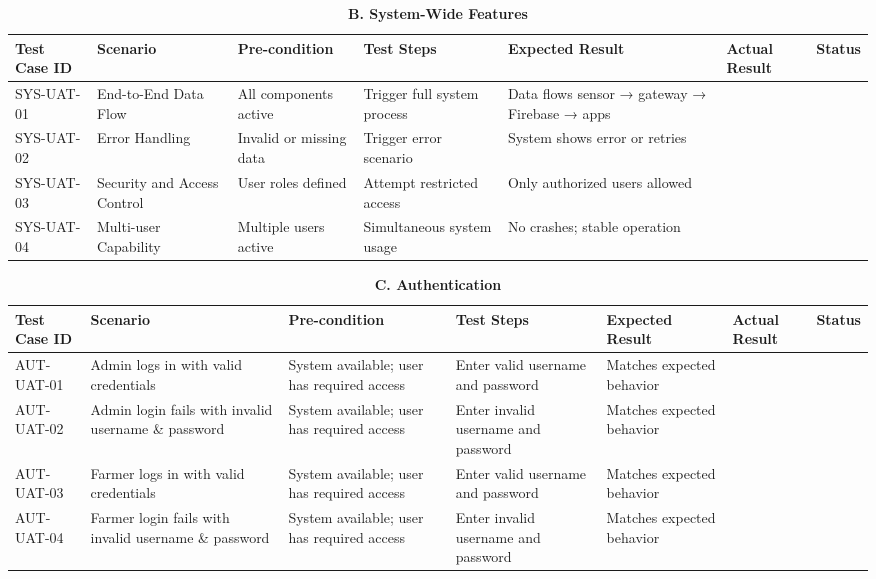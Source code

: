 {	
	\begin{table}[H]
		\centering
		\renewcommand{\arraystretch}{1.2}
		\caption*{\textbf{B. System-Wide Features}}
		
		\begin{adjustbox}{max width=\textwidth}
			\begin{tabular}{p{2cm}p{3cm}p{3cm}p{3cm}p{4cm}p{4cm}p{1.5cm}}
				\toprule
				\textbf{Test Case ID} & \textbf{Scenario} & \textbf{Pre-condition} & \textbf{Test Steps} & \textbf{Expected Result} & \textbf{Actual Result} & \textbf{Status} \\
				\midrule
				SYS-UAT-01 & End-to-End Data Flow & All components active & Trigger full system process & Data flows sensor → gateway → Firebase → apps & & \\
				SYS-UAT-02 & Error Handling & Invalid or missing data & Trigger error scenario & System shows error or retries & & \\
				SYS-UAT-03 & Security and Access Control & User roles defined & Attempt restricted access & Only authorized users allowed & & \\
				SYS-UAT-04 & Multi-user Capability & Multiple users active & Simultaneous system usage & No crashes; stable operation & & \\
				\bottomrule
			\end{tabular}
		\end{adjustbox}
	\end{table}
	
	
	\begin{table}[H]
		\centering
		\renewcommand{\arraystretch}{1.2}
		\caption*{\textbf{C. Authentication}}
		
		\begin{adjustbox}{max width=\textwidth}
			\begin{tabular}{p{2cm}p{3cm}p{3cm}p{3cm}p{4cm}p{4cm}p{1.5cm}}
				\toprule
				\textbf{Test Case ID} & \textbf{Scenario} & \textbf{Pre-condition} & \textbf{Test Steps} & \textbf{Expected Result} & \textbf{Actual Result} & \textbf{Status} \\
				\midrule
				AUT-UAT-01 & Admin logs in with valid credentials & System available; user has required access & Enter valid username and password & Matches expected behavior & & \\
				AUT-UAT-02 & Admin login fails with invalid username \& password & System available; user has required access & Enter invalid username and password & Matches expected behavior & & \\
				AUT-UAT-03 & Farmer logs in with valid credentials & System available; user has required access & Enter valid username and password & Matches expected behavior & & \\
				AUT-UAT-04 & Farmer login fails with invalid username \& password & System available; user has required access & Enter invalid username and password & Matches expected behavior & & \\
				\bottomrule
			\end{tabular}
		\end{adjustbox}
	\end{table}
	
}
